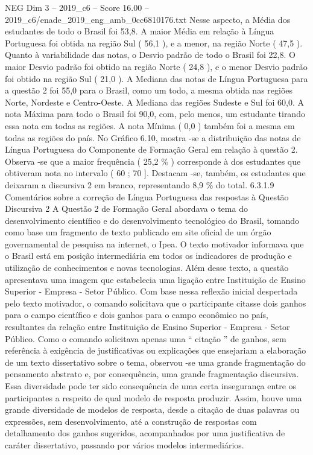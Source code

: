 \begin{textsample}{NEG Dim 3 – 2019\_c6 – Score 16.00 – 2019\_c6/enade\_2019\_eng\_amb\_0cc6810176.txt}
Nesse aspecto, a Média dos estudantes de todo o Brasil foi 53,8.
A maior Média em relação à Língua Portuguesa foi obtida na região Sul ( 56,1 ), e a menor, na região Norte ( 47,5 ).
Quanto à variabilidade das notas, o Desvio padrão de todo o Brasil foi 22,8.
O maior Desvio padrão foi obtido na região Norte ( 24,8 ), e o menor Desvio padrão foi obtido na região Sul ( 21,0 ).
A Mediana das notas de Língua Portuguesa para a questão 2 foi 55,0 para o Brasil, como um todo, a mesma obtida nas regiões Norte, Nordeste e Centro-Oeste.
A Mediana das regiões Sudeste e Sul foi 60,0.
A nota Máxima para todo o Brasil foi 90,0, com, pelo menos, um estudante tirando essa nota em todas as regiões.
A nota Mínima ( 0,0 ) também foi a mesma em todas as regiões do país.
No Gráfico 6.10, mostra -se a distribuição das notas de Língua Portuguesa do Componente de Formação Geral em relação à questão 2.
Observa -se que a maior frequência ( 25,2 \% ) corresponde à dos estudantes que obtiveram nota no intervalo ( 60 ; 70 ].
Destacam -se, também, os estudantes que deixaram a discursiva 2 em branco, representando 8,9 \% do total. 6.3.1.9 Comentários sobre a correção de Língua Portuguesa das respostas à Questão Discursiva 2 A Questão 2 de Formação Geral abordava o tema do desenvolvimento científico e do desenvolvimento tecnológico do Brasil, tomando como base um fragmento de texto publicado em site oficial de um órgão governamental de pesquisa na internet, o Ipea.
O texto motivador informava que o Brasil está em posição intermediária em todos os indicadores de produção e utilização de conhecimentos e novas tecnologias.
Além desse texto, a questão apresentava uma imagem que estabelecia uma ligação entre Instituição de Ensino Superior - Empresa - Setor Público.
Com base nessa reflexão inicial despertada pelo texto motivador, o comando solicitava que o participante citasse dois ganhos para o campo científico e dois ganhos para o campo econômico no país, resultantes da relação entre Instituição de Ensino Superior - Empresa - Setor Público.
Como o comando solicitava apenas uma “ citação ” de ganhos, sem referência à exigência de justificativas ou explicações que ensejariam a elaboração de um texto dissertativo sobre o tema, observou -se uma grande fragmentação do pensamento abstrato e, por consequência, uma grande fragmentação discursiva.
Essa diversidade pode ter sido consequência de uma certa insegurança entre os participantes a respeito de qual modelo de resposta produzir.
Assim, houve uma grande diversidade de modelos de resposta, desde a citação de duas palavras ou expressões, sem desenvolvimento, até a construção de respostas com detalhamento dos ganhos sugeridos, acompanhados por uma justificativa de caráter dissertativo, passando por vários modelos intermediários.

\end{textsample}
